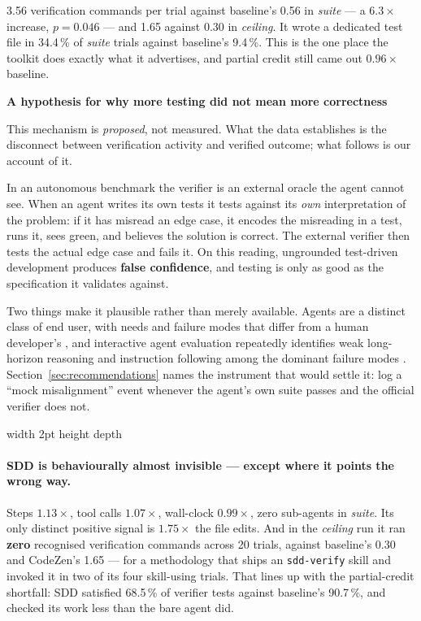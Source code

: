 \documentclass[11pt,a4paper]{article}
\newenvironment{finding}[1]
  {\par\medskip\noindent\begin{lrbox}{\findingbox}%
   \begin{minipage}{\dimexpr\linewidth-2\fboxsep-4pt}%
   \vspace{3pt}\textbf{\color{accent}#1}\par\smallskip\small}
  {\vspace{4pt}\end{minipage}\end{lrbox}%
   \noindent\textcolor{accent}{\vrule width 2pt height \dimexpr\ht\findingbox\relax depth \dimexpr\dp\findingbox\relax}%
   \colorbox{shade}{\usebox{\findingbox}}\par\medskip}
\newcommand{\code}[1]{\texttt{\small #1}}
\begin{document}
3.56 verification commands per trial against baseline's 0.56 in \emph{suite} --- a
$6.3\times$ increase, $p = 0.046$ --- and 1.65 against 0.30 in \emph{ceiling}. It wrote a dedicated test file in 34.4\,\% of
\emph{suite} trials against baseline's 9.4\,\%. This is the one place the toolkit does exactly
what it advertises, and partial credit still came out $0.96\times$ baseline.

\begin{finding}{A hypothesis for why more testing did not mean more correctness}
This mechanism is \emph{proposed}, not measured. What the data establishes is the disconnect
between verification activity and verified outcome; what follows is our account of it.

In an autonomous benchmark the verifier is an external oracle the agent cannot see. When an
agent writes its own tests it tests against its \emph{own} interpretation of the problem: if
it has misread an edge case, it encodes the misreading in a test, runs it, sees green, and
believes the solution is correct. The external verifier then tests the actual edge case and
fails it. On this reading, ungrounded test-driven development produces \textbf{false
confidence}, and testing is only as good as the specification it validates against.

Two things make it plausible rather than merely available. Agents are a distinct class of end
user, with needs and failure modes that differ from a human developer's
\citep{yang2024sweagent}, and interactive agent evaluation repeatedly identifies weak
long-horizon reasoning and instruction following among the dominant failure modes
\citep{liu2024agentbench}. Section~\ref{sec:recommendations} names the instrument that would
settle it: log a ``mock misalignment'' event whenever the agent's own suite passes and the
official verifier does not.
\end{finding}

\paragraph{SDD is behaviourally almost invisible --- except where it points the wrong way.}
Steps $1.13\times$, tool calls $1.07\times$, wall-clock $0.99\times$, zero sub-agents in
\emph{suite}. Its only distinct positive signal is $1.75\times$ the file edits. And in the
\emph{ceiling} run it ran \textbf{zero} recognised verification commands across 20 trials,
against baseline's 0.30 and CodeZen's 1.65 --- for a methodology that ships an
\code{sdd-verify} skill and invoked it in two of its four skill-using trials. That lines up
with the partial-credit shortfall: SDD satisfied 68.5\,\% of verifier tests against
baseline's 90.7\,\%, and checked its work less than the bare agent did.
\end{document}
